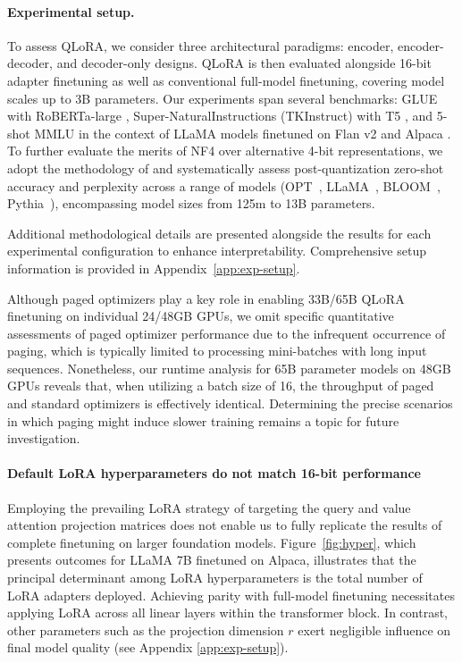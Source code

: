 \paragraph{Experimental setup.} To assess QLoRA, we consider three architectural paradigms: encoder, encoder-decoder, and decoder-only designs. QLoRA is then evaluated alongside 16-bit adapter finetuning as well as conventional full-model finetuning, covering model scales up to 3B parameters. Our experiments span several benchmarks: GLUE \citep{wang2018glue} with RoBERTa-large \citep{liu2019roberta}, Super-NaturalInstructions (TKInstruct) \citep{wang2022super} with T5 \citep{t5}, and 5-shot MMLU \citep{hendrycksmeasuring} in the context of LLaMA models finetuned on Flan v2 \citep{longpre2023flan} and Alpaca \citep{alpaca}. To further evaluate the merits of NF4 over alternative 4-bit representations, we adopt the methodology of \citet{dettmers2022case} and systematically assess post-quantization zero-shot accuracy and perplexity across a range of models (OPT~\citep{zhang2022opt}, LLaMA~\citep{touvron2023llama}, BLOOM~\citep{scao2022bloom}, Pythia~\citep{biderman2023pythia}), encompassing model sizes from 125m to 13B parameters.

Additional methodological details are presented alongside the results for each experimental configuration to enhance interpretability. Comprehensive setup information is provided in Appendix~\ref{app:exp-setup}.

Although paged optimizers play a key role in enabling 33B/65B \textsc{QLoRA} finetuning on individual 24/48GB GPUs, we omit specific quantitative assessments of paged optimizer performance due to the infrequent occurrence of paging, which is typically limited to processing mini-batches with long input sequences. Nonetheless, our runtime analysis for 65B parameter models on 48GB GPUs reveals that, when utilizing a batch size of 16, the throughput of paged and standard optimizers is effectively identical. Determining the precise scenarios in which paging might induce slower training remains a topic for future investigation.

\paragraph{Default LoRA hyperparameters do not match 16-bit performance}

Employing the prevailing LoRA strategy of targeting the query and value attention projection matrices \citep{hu2021lora} does not enable us to fully replicate the results of complete finetuning on larger foundation models. Figure~\ref{fig:hyper}, which presents outcomes for LLaMA 7B finetuned on Alpaca, illustrates that the principal determinant among LoRA hyperparameters is the total number of LoRA adapters deployed. Achieving parity with full-model finetuning necessitates applying LoRA across all linear layers within the transformer block. In contrast, other parameters such as the projection dimension $r$ exert negligible influence on final model quality (see Appendix \ref{app:exp-setup}).

